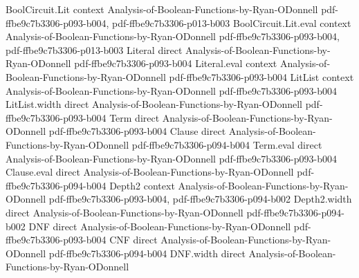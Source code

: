 \begin{theorem}
\label{LMN.switching_bernoulli_dtDepth_function}
\leanok
{}
\proofstep
  {BoolCircuit.Lit}
  {context}
  {Analysis-of-Boolean-Functions-by-Ryan-ODonnell}
  {pdf-ffbe9c7b3306-p093-b004,
    pdf-ffbe9c7b3306-p013-b003}
\proofstep
  {BoolCircuit.Lit.eval}
  {context}
  {Analysis-of-Boolean-Functions-by-Ryan-ODonnell}
  {pdf-ffbe9c7b3306-p093-b004,
    pdf-ffbe9c7b3306-p013-b003}
\proofstep
  {Literal}
  {direct}
  {Analysis-of-Boolean-Functions-by-Ryan-ODonnell}
  {pdf-ffbe9c7b3306-p093-b004}
\proofstep
  {Literal.eval}
  {context}
  {Analysis-of-Boolean-Functions-by-Ryan-ODonnell}
  {pdf-ffbe9c7b3306-p093-b004}
\proofstep
  {LitList}
  {context}
  {Analysis-of-Boolean-Functions-by-Ryan-ODonnell}
  {pdf-ffbe9c7b3306-p093-b004}
\proofstep
  {LitList.width}
  {direct}
  {Analysis-of-Boolean-Functions-by-Ryan-ODonnell}
  {pdf-ffbe9c7b3306-p093-b004}
\proofstep
  {Term}
  {direct}
  {Analysis-of-Boolean-Functions-by-Ryan-ODonnell}
  {pdf-ffbe9c7b3306-p093-b004}
\proofstep
  {Clause}
  {direct}
  {Analysis-of-Boolean-Functions-by-Ryan-ODonnell}
  {pdf-ffbe9c7b3306-p094-b004}
\proofstep
  {Term.eval}
  {direct}
  {Analysis-of-Boolean-Functions-by-Ryan-ODonnell}
  {pdf-ffbe9c7b3306-p093-b004}
\proofstep
  {Clause.eval}
  {direct}
  {Analysis-of-Boolean-Functions-by-Ryan-ODonnell}
  {pdf-ffbe9c7b3306-p094-b004}
\proofstep
  {Depth2}
  {context}
  {Analysis-of-Boolean-Functions-by-Ryan-ODonnell}
  {pdf-ffbe9c7b3306-p093-b004,
    pdf-ffbe9c7b3306-p094-b002}
\proofstep
  {Depth2.width}
  {direct}
  {Analysis-of-Boolean-Functions-by-Ryan-ODonnell}
  {pdf-ffbe9c7b3306-p094-b002}
\proofstep
  {DNF}
  {direct}
  {Analysis-of-Boolean-Functions-by-Ryan-ODonnell}
  {pdf-ffbe9c7b3306-p093-b004}
\proofstep
  {CNF}
  {direct}
  {Analysis-of-Boolean-Functions-by-Ryan-ODonnell}
  {pdf-ffbe9c7b3306-p094-b004}
\proofstep
  {DNF.width}
  {direct}
  {Analysis-of-Boolean-Functions-by-Ryan-ODonnell}

\end{theorem}
